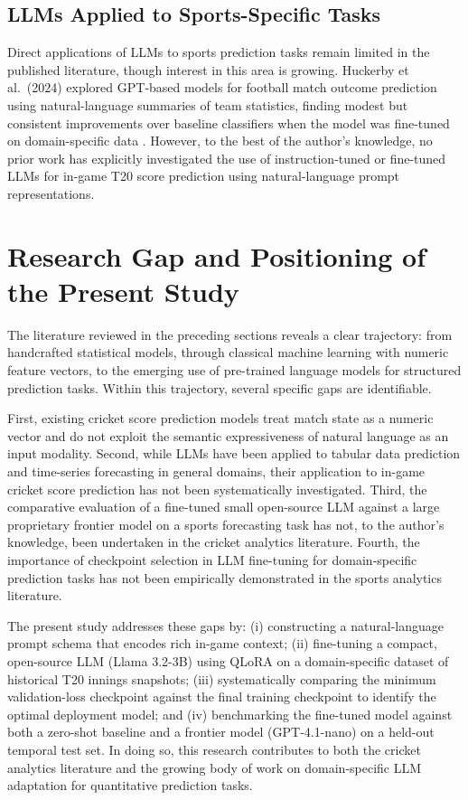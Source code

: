 \subsection{LLMs Applied to Sports-Specific Tasks}

Direct applications of LLMs to sports prediction tasks remain limited in the published literature, though interest in this area is growing. Huckerby et al.\ (2024) explored GPT-based models for football match outcome prediction using natural-language summaries of team statistics, finding modest but consistent improvements over baseline classifiers when the model was fine-tuned on domain-specific data \cite{huckerby2024llm}. However, to the best of the author's knowledge, no prior work has explicitly investigated the use of instruction-tuned or fine-tuned LLMs for in-game T20 score prediction using natural-language prompt representations.

\section{Research Gap and Positioning of the Present Study}

The literature reviewed in the preceding sections reveals a clear trajectory: from handcrafted statistical models, through classical machine learning with numeric feature vectors, to the emerging use of pre-trained language models for structured prediction tasks. Within this trajectory, several specific gaps are identifiable.

First, existing cricket score prediction models treat match state as a numeric vector and do not exploit the semantic expressiveness of natural language as an input modality. Second, while LLMs have been applied to tabular data prediction and time-series forecasting in general domains, their application to in-game cricket score prediction has not been systematically investigated. Third, the comparative evaluation of a fine-tuned small open-source LLM against a large proprietary frontier model on a sports forecasting task has not, to the author's knowledge, been undertaken in the cricket analytics literature. Fourth, the importance of checkpoint selection in LLM fine-tuning for domain-specific prediction tasks has not been empirically demonstrated in the sports analytics literature.

The present study addresses these gaps by: (i) constructing a natural-language prompt schema that encodes rich in-game context; (ii) fine-tuning a compact, open-source LLM (Llama 3.2-3B) using QLoRA on a domain-specific dataset of historical T20 innings snapshots; (iii) systematically comparing the minimum validation-loss checkpoint against the final training checkpoint to identify the optimal deployment model; and (iv) benchmarking the fine-tuned model against both a zero-shot baseline and a frontier model (GPT-4.1-nano) on a held-out temporal test set. In doing so, this research contributes to both the cricket analytics literature and the growing body of work on domain-specific LLM adaptation for quantitative prediction tasks.
